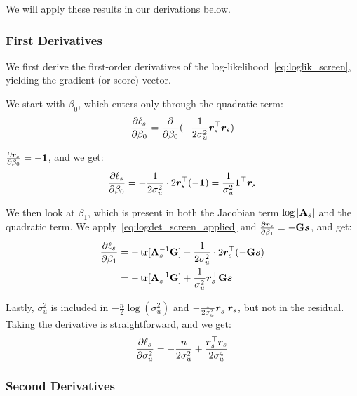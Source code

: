We will apply these results in our derivations below.

\subsubsection{First Derivatives}

We first derive the first-order derivatives of the log-likelihood~\eqref{eq:loglik_screen}, yielding the gradient (or score) vector.

We start with $\beta_0$, which enters only through the quadratic term:
\begin{equation}
    \frac{\partial \ell_s}{\partial \beta_0}
    = \frac{\partial}{\partial \beta_0} (-\frac{1}{2\sigma_u^2}\bm{r}_s^\top\bm{r}_s)
\end{equation}

$\frac{\partial \bm{r}_s}{\partial \beta_0} = -\bm{1}$, and we get:
\begin{equation}
    \frac{\partial \ell_s}{\partial \beta_0}
    = -\frac{1}{2\sigma_u^2} \cdot 2\bm{r}_s^\top(-\bm{1})
    = \frac{1}{\sigma_u^2}\bm{1}^\top\bm{r}_s
\end{equation}

We then look at $\beta_1$, which is present in both the Jacobian term $\log|\mathbf{A}_s|$ and the quadratic term. We apply~\eqref{eq:logdet_screen_applied} and $\frac{\partial \bm{r}_s}{\partial \beta_1} = -\mathbf{G}\bm{s}$, and get:
\begin{align}
    \frac{\partial \ell_s}{\partial \beta_1}
    &= -\operatorname{tr}[\mathbf{A}_s^{-1}\mathbf{G}] - \frac{1}{2\sigma_u^2} \cdot 2\bm{r}_s^\top(-\mathbf{G}\bm{s}) \nonumber\\
    &= -\operatorname{tr}[\mathbf{A}_s^{-1}\mathbf{G}] + \frac{1}{\sigma_u^2}\bm{r}_s^\top\mathbf{G}\bm{s}
\end{align}

Lastly, $\sigma_u^2$ is included in $-\frac{n}{2}\log(\sigma_u^2)$ and $-\frac{1}{2\sigma_u^2}\bm{r}_s^\top\bm{r}_s$, but not in the residual. Taking the derivative is straightforward, and we get:
\begin{equation}
    \frac{\partial \ell_s}{\partial \sigma_u^2}
    = -\frac{n}{2\sigma_u^2} + \frac{\bm{r}_s^\top\bm{r}_s}{2\sigma_u^4}
\end{equation}

\subsubsection{Second Derivatives}

